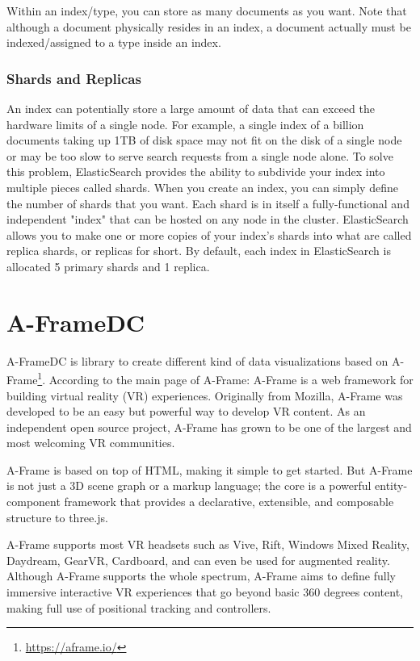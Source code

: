\documentclass[a4paper, 12pt]{book}
\begin{document}
Within an index/type, you can store as many documents as you want. Note that although a document physically resides in an index, a document actually must be indexed/assigned to a type inside an index.

\subsubsection{Shards and Replicas}
An index can potentially store a large amount of data that can exceed the hardware limits of a single node. For example, a single index of a billion documents taking up 1TB of disk space may not fit on the disk of a single node or may be too slow to serve search requests from a single node alone. To solve this problem, ElasticSearch provides the ability to subdivide your index into multiple pieces called shards. When you create an index, you can simply define the number of shards that you want. Each shard is in itself a fully-functional and independent "index" that can be hosted on any node in the cluster.
ElasticSearch allows you to make one or more copies of your index's shards into what are called replica shards, or replicas for short. By default, each index in ElasticSearch is allocated 5 primary shards and 1 replica.

\section{A-FrameDC}
\label{sec:aframedc}

A-FrameDC is library to create different kind of data visualizations based on A-Frame\footnote{\url{https://aframe.io/}}. According to the main page of A-Frame: A-Frame is a web framework for building virtual reality (VR) experiences. Originally from Mozilla, A-Frame was developed to be an easy but powerful way to develop VR content. As an independent open source project, A-Frame has grown to be one of the largest and most welcoming VR communities.

A-Frame is based on top of HTML, making it simple to get started. But A-Frame is not just a 3D scene graph or a markup language; the core is a powerful entity-component framework that provides a declarative, extensible, and composable structure to three.js.

A-Frame supports most VR headsets such as Vive, Rift, Windows Mixed Reality, Daydream, GearVR, Cardboard, and can even be used for augmented reality. Although A-Frame supports the whole spectrum, A-Frame aims to define fully immersive interactive VR experiences that go beyond basic 360 degrees content, making full use of positional tracking and controllers.
\end{document}

